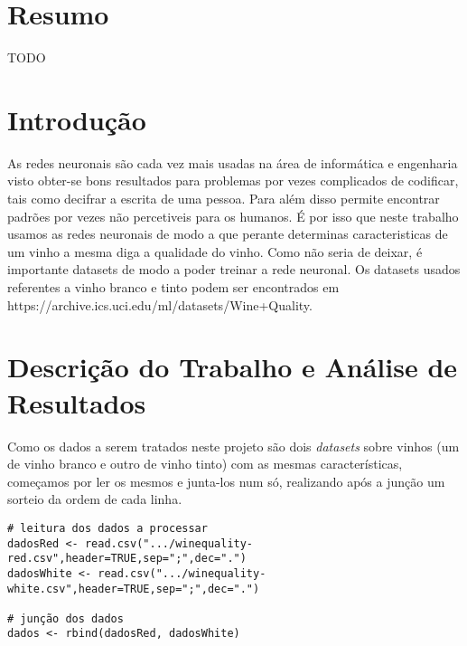 \documentclass{article}
\begin{document}
\section{Resumo}
{\color{red}TODO}
\vspace*{\fill}

\newpage

\vspace*{\fill}
\tableofcontents
\vspace*{\fill}

\newpage

\vspace*{\fill}
\section{Introdução}
As redes neuronais são cada vez mais usadas na área de informática e engenharia visto obter-se bons resultados para problemas por vezes complicados de codificar, tais como decifrar a escrita de uma pessoa. Para além disso permite encontrar padrões por vezes não percetiveis para os humanos. É por isso que neste trabalho usamos as redes neuronais de modo a que perante determinas caracteristicas de um vinho a mesma diga a qualidade do vinho. Como não seria de deixar, é importante datasets de modo a poder treinar a rede neuronal. Os datasets usados referentes a vinho branco e tinto podem ser encontrados em https://archive.ics.uci.edu/ml/datasets/Wine+Quality.
\vspace*{\fill}

\newpage

\section{Descrição do Trabalho e Análise de Resultados}

Como os dados a serem tratados neste projeto são dois \textit{datasets} sobre vinhos (um de vinho branco e outro de vinho tinto) com as mesmas características, começamos por ler os mesmos e junta-los num só, realizando após a junção um sorteio da ordem de cada linha.

\begin{verbatim}
# leitura dos dados a processar
dadosRed <- read.csv(".../winequality-red.csv",header=TRUE,sep=";",dec=".")
dadosWhite <- read.csv(".../winequality-white.csv",header=TRUE,sep=";",dec=".")

# junção dos dados
dados <- rbind(dadosRed, dadosWhite)
\end{verbatim}
\end{document}
